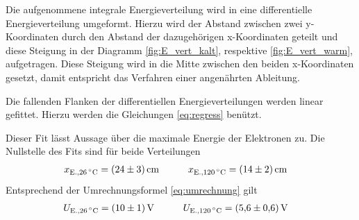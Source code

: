 Die aufgenommene integrale Energieverteilung wird in eine differentielle Energieverteilung umgeformt.
Hierzu wird der Abstand zwischen zwei y-Koordinaten durch den Abstand der dazugehörigen x-Koordinaten geteilt und diese Steigung in der Diagramm \ref{fig:E_vert_kalt}, respektive \ref{fig:E_vert_warm}, aufgetragen. 
Diese Steigung wird in die Mitte zwischen den beiden x-Koordinaten gesetzt, damit entspricht das Verfahren einer angenährten Ableitung.

Die fallenden Flanken der differentiellen Energieverteilungen werden linear gefittet.
Hierzu werden die Gleichungen \ref{eq:regress} benützt.

Dieser Fit lässt Aussage über die maximale Energie der Elektronen zu. 
Die Nullstelle des Fits sind für beide Verteilungen
\begin{alignat}{3}
	x_\text{E.,\SI{26}{\degreeCelsius}}= \SI{24(3)}{\centi\meter} &\qquad &&x_\text{E.,\SI{120}{\degreeCelsius}}= \SI{14(2)}{\centi\meter}
\end{alignat}
Entsprechend der Umrechnungsformel \eqref{eq:umrechnung} gilt
\begin{alignat}{3}
	U_\text{E.,\SI{26}{\degreeCelsius}}= \SI{10(1)}{\volt} &\qquad &&U_\text{E.,\SI{120}{\degreeCelsius}}= \SI{5.6(6)}{\volt}
\end{alignat}


